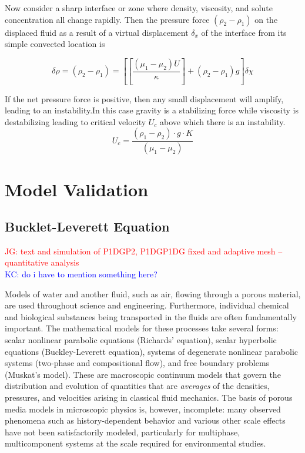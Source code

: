 \documentclass[preprint,authoryear,12pt]{elsarticle}
\begin{document}
Now consider a sharp interface or zone where density, viscosity, and solute concentration all change rapidly. Then the pressure force $(\rho_2-\rho_1)$ on the displaced fluid as a result of a virtual displacement $\delta_x$ of the interface from its simple convected location is 

\begin{equation}
\delta\rho=(\rho_2-\rho_1)=[[\frac{(\mu_1-\mu_2)U}{\kappa}]+(\rho_2-\rho_1)g] \delta\chi
\end{equation}

If the net pressure force is positive, then any small displacement will amplify, leading to an instability.In this case gravity is a stabilizing force while viscosity is destabilizing leading to critical velocity $U_c$ above which there is an instability.\\

\begin{equation}
U_c = \frac{(\rho_1-\rho_2) \cdot g \cdot K}{(\mu_1-\mu_2)}
\end{equation}

\section{Model Validation}\label{section:ModelValidation}
 
\subsection{Bucklet-Leverett Equation}\label{section:BuckletLeverettEquation}
\textcolor{red}{JG: text and simulation of P1DGP2, P1DGP1DG fixed and adaptive mesh -- quantitative analysis}\\
\textcolor{blue}{KC: do i have to mention something here?\\}

Models of water and another fluid, such as air, flowing through a
porous material, are used throughout science and
engineering.  Furthermore, individual chemical and biological
substances being transported in the fluids are often fundamentally
important. The mathematical models for these processes take several forms: scalar nonlinear parabolic equations (Richards' equation), scalar hyperbolic equations (Buckley-Leverett equation), systems of degenerate nonlinear parabolic systems (two-phase and compositional flow), and free boundary problems (Muskat's model). These are macroscopic continuum models that govern the distribution and evolution of quantities that are {\em averages} of the densities, pressures, and velocities arising in classical fluid mechanics. The basis of porous media models in microscopic physics is, however, incomplete: many observed phenomena such as history-dependent behavior and various other scale effects have not been satisfactorily modeled, particularly for multiphase,
multicomponent systems at the scale required for environmental
studies.
\end{document}

